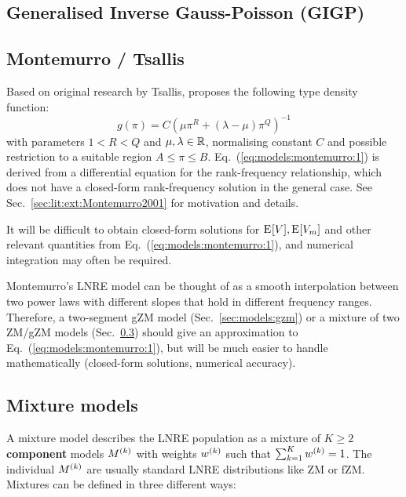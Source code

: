 \documentclass[a4paper]{article}
\begin{document}
\subsection{Generalised Inverse Gauss-Poisson (GIGP)}
\label{sec:models:gigp}

\subsection{Montemurro / Tsallis}
\label{sec:models:montemurro}

Based on original research by Tsallis,  \citet{Montemurro:01} proposes the following type density function:
\begin{equation}
  \label{eq:models:montemurro:1}
  g(\pi) = C \left( \mu \pi^R + (\lambda - \mu) \pi^Q  \right)^{-1}
\end{equation}
with parameters $1 < R < Q$ and $\mu, \lambda\in \mathbb{R}$, normalising constant $C$ and possible restriction to a suitable region $A\leq \pi\leq B$.  Eq.~(\ref{eq:models:montemurro:1}) is derived from a differential equation for the rank-frequency relationship, which does not have a closed-form rank-frequency solution in the general case.  See Sec.~\ref{sec:lit:ext:Montemurro2001} for motivation and details.

It will be difficult to obtain closed-form solutions for $\mathrm{E}_{}[V], \mathrm{E}_{}[V_m]$ and other relevant quantities from Eq.~(\ref{eq:models:montemurro:1}), and numerical integration may often be required.

Montemurro's LNRE model can be thought of as a smooth interpolation between two power laws with different slopes that hold in different frequency ranges.  Therefore, a two-segment gZM model (Sec.~\ref{sec:models:gzm}) or a mixture of two ZM/gZM models (Sec.~\ref{sec:models:mixtures}) should give an approximation to Eq.~(\ref{eq:models:montemurro:1}), but will be much easier to handle mathematically (closed-form solutions, numerical accuracy).


\subsection{Mixture models}
\label{sec:models:mixtures}

A mixture model describes the LNRE population as a mixture of $K\geq 2$
\textbf{component} models $M^{(k)}$ with weights $w^{(k)}$ such that
$\sum_{k=1}^K w^{(k)} = 1$.  The individual $M^{(k)}$ are usually standard LNRE
distributions like ZM or fZM.  Mixtures can be defined in three different
ways:
\end{document}
